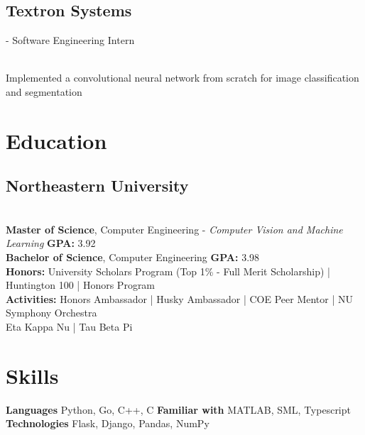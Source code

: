 \documentclass{resume}
\begin{document}
\subsection{Textron Systems}- Software Engineering Intern \\
\\
\begin{tightemize}
	\item Implemented a convolutional neural network from scratch for image classification and segmentation
\end{tightemize}

\section{Education}

\subsection{Northeastern University} \\
\fontsize{10.5pt}{12pt}\selectfont
\textbf{Master of Science}, Computer Engineering - \textit{Computer Vision and Machine Learning} \hfill 
\textbf{GPA:} 3.92 \\
\textbf{Bachelor of Science}, Computer Engineering \hfill 
\textbf{GPA:} 3.98 \\
\hspace*{8.5mm}\textbf{Honors:} University Scholars Program (Top 1\% - Full Merit Scholarship) | Huntington 100 | Honors Program \\ 
\hspace*{8.5mm}\textbf{Activities:} Honors Ambassador | Husky Ambassador | COE Peer Mentor | NU Symphony Orchestra \\ 
\hspace*{25.28mm} Eta Kappa Nu | Tau Beta Pi

\section{Skills}

\fontsize{10.5pt}{12pt}\selectfont
\vspace{-1mm}
\textbf{Languages}\hspace{1mm} Python, Go, C++, C\hspace{1.5mm} \textbf{Familiar with} MATLAB, SML, Typescript\\
\textbf{Technologies}\hspace{1mm} Flask, Django, Pandas, NumPy
\end{document}

